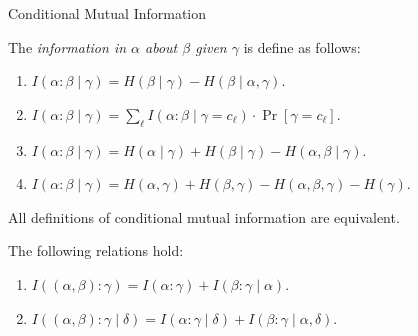 \documentclass[aspectratio=169]{beamer}
\begin{document}
\begin{frame}{Conditional Mutual Information}
\begin{definition}
    The \emph{information in \(\alpha\) about \(\beta\) given \(\gamma\)} is define as follows:
    \begin{enumerate}
        \item \(I(\alpha:\beta\mid\gamma) = H(\beta\mid\gamma) - H(\beta\mid\alpha,\gamma)\).
        \item \(I(\alpha:\beta\mid\gamma) = \sum_\ell I(\alpha:\beta \mid \gamma = c_\ell) \cdot \Pr[\gamma = c_\ell]\).
        \item \(I(\alpha:\beta\mid\gamma) = H(\alpha\mid\gamma) + H(\beta\mid\gamma) - H(\alpha,\beta\mid\gamma)\).
        \item \(I(\alpha:\beta\mid\gamma) = H(\alpha,\gamma) + H(\beta,\gamma) - H(\alpha,\beta,\gamma) - H(\gamma)\).
    \end{enumerate}
\end{definition}

\begin{lemma}
    All definitions of conditional mutual information are equivalent.
\end{lemma}

\begin{lemma}
    The following relations hold:
    \begin{enumerate}
        \item \(I((\alpha,\beta) : \gamma) = I(\alpha : \gamma) + I(\beta: \gamma \mid \alpha)\).
        \item \(I((\alpha,\beta) : \gamma \mid \delta) = I(\alpha : \gamma \mid \delta) + I(\beta: \gamma \mid \alpha, \delta)\).
    \end{enumerate}
\end{lemma}
\end{frame}
\end{document}
